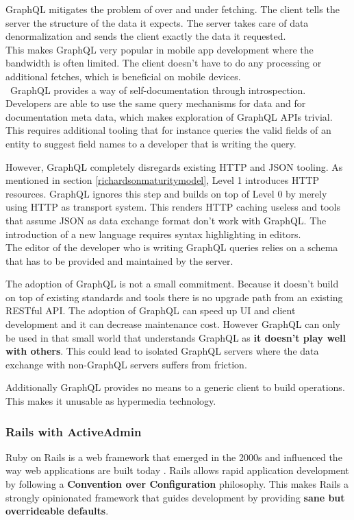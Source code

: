 GraphQL mitigates the problem of over and under fetching. The client tells the server the structure of the data it expects. The server takes care of data denormalization and sends the client exactly the data it requested. \\ This makes GraphQL very popular in mobile app development where the bandwidth is often limited. The client doesn't have to do any processing or additional fetches, which is beneficial on mobile devices. \\\
GraphQL provides a way of self-documentation through introspection. Developers are able to use the same query mechanisms for data and for documentation meta data, which makes exploration of GraphQL APIs trivial. This requires additional tooling that for instance queries the valid fields of an entity to suggest field names to a developer that is writing the query.

However, GraphQL completely disregards existing HTTP and JSON tooling. As mentioned in section \ref{richardsonmaturitymodel}, Level 1 introduces HTTP resources. GraphQL ignores this step and builds on top of Level 0 by merely using HTTP as transport system. This renders HTTP caching useless and tools that assume JSON as data exchange format don't work with GraphQL. The introduction of a new language requires syntax highlighting in editors. \\
The editor of the developer who is writing GraphQL queries relies on a schema that has to be provided and maintained by the server.

The adoption of GraphQL is not a small commitment. Because it doesn't build on top of existing standards and tools there is no upgrade path from an existing RESTful API. The adoption of GraphQL can speed up UI and client development and it can decrease maintenance cost. However GraphQL can only be used in that small world that understands GraphQL as \textbf{it doesn't play well with others}. This could lead to isolated GraphQL servers where the data exchange with non-GraphQL servers suffers from friction.

Additionally GraphQL provides no means to a generic client to build operations. This makes it unusable as hypermedia technology.

\subsubsection{Rails with ActiveAdmin}
Ruby on Rails is a web framework that emerged in the 2000s and influenced the way web applications are built today \citep{rubyonrails}. Rails allows rapid application development by following a \textbf{Convention over Configuration} philosophy. This makes Rails a strongly opinionated framework that guides development by providing \textbf{sane but overrideable defaults}.

